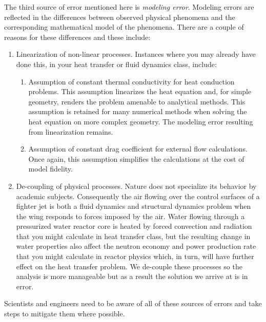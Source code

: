 The third source of error mentioned here is \emph{modeling error}.  Modeling errors are reflected in the differences between observed physical phenomena and the corresponding mathematical model of the phenomena.  There are a couple of reasons for these differences and these include:
\begin{enumerate}
\item Linearization of non-linear processes.  Instances where you may already have done this, in your heat transfer or fluid dynamics class, include:
\begin{enumerate}
\item Assumption of constant thermal conductivity for heat conduction problems.  This assumption linearizes the heat equation and, for simple geometry, renders the problem amenable to analytical methods.  This assumption is retained for many numerical methods when solving the heat equation on more complex geometry.  The modeling error resulting from linearization remains.

\item Assumption of constant drag coefficient for external flow calculations.  Once again, this assumption simplifies the calculations at the cost of model fidelity.
\end{enumerate}

\item De-coupling of physical processes.  Nature does not specialize its behavior by academic subjects.  Consequently the air flowing over the control surfaces of a fighter jet is both a fluid dynamics and structural dynamics problem when the wing responds to forces imposed by the air.  Water flowing through a pressurized water reactor core is heated by forced convection and radiation that you might calculate in heat transfer class, but the resulting change in water properties also affect the neutron economy and power production rate that you might calculate in reactor physics which, in turn, will have further effect on the heat transfer problem.  We de-couple these processes so the analysis is more manageable but as a result the solution we arrive at is in error.  

\end{enumerate}  
Scientists and engineers need to be aware of all of these sources of errors and take steps to mitigate them where possible.




